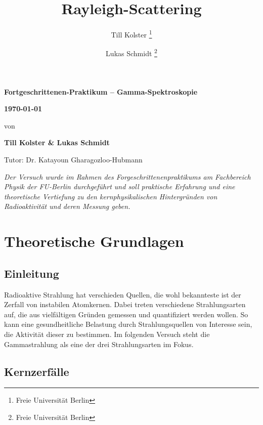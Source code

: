\documentclass[
	parskip=half,10pt,
	numbers= noenddot, %
	toc=flat, %
	oneside,
	twocolumn,
	]{scrartcl}
\title {Rayleigh-Scattering}
\author {Till Kolster \thanks{Freie Universität Berlin} \and Lukas Schmidt \thanks{Freie Universität Berlin}}
\begin{document}
\begin{titlepage}

\vspace*{-2cm}

\vspace{6cm}
\begin{center}
\huge \bfseries
Fortgeschrittenen-Praktikum -- Gamma-Spektroskopie

\vspace{0.5cm}
\large \bfseries
\today

\vspace{1.5cm}

\large\normalfont von

\bigskip
\textbf{Till Kolster \& Lukas Schmidt}

\bigskip
Tutor: Dr. Katayoun Gharagozloo-Hubmann

\vspace{3cm}

\parbox{0.8\linewidth}{%
\textit{Der Versuch wurde im Rahmen des Forgeschrittenenpraktikums am Fachbereich Physik der FU-Berlin durchgeführt und soll praktische Erfahrung und eine 
theoretische Vertiefung zu den kernphysikalischen Hintergründen von Radioaktivität und deren Messung geben.}}


\end{center}
\end{titlepage}


\section{Theoretische Grundlagen}

\subsection{Einleitung}

Radioaktive Strahlung hat verschieden Quellen, die wohl bekannteste ist der Zerfall von instabilen Atomkernen. Dabei treten verschiedene Strahlungsarten auf, 
die aus vielfältigen Gründen gemessen und quantifiziert werden wollen. So kann eine gesundheitliche Belastung durch Strahlungsquellen von Interesse sein, die 
Aktivität dieser zu bestimmen. Im folgenden Versuch steht die Gammastrahlung als eine der drei Strahlungsarten im Fokus.  

\subsection{Kernzerfälle}
\end{document}
